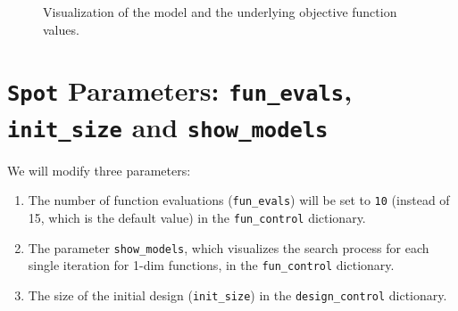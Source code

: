 \documentclass[
  letterpaper,
  DIV=11,
  numbers=noendperiod]{scrreprt}
\providecommand{\tightlist}{%
  \setlength{\itemsep}{0pt}\setlength{\parskip}{0pt}}\usepackage{longtable,booktabs,array}
\begin{document}
\begin{figure}[H]


\caption{\label{fig-spot-model-1d}Visualization of the model and the
underlying objective function values.}

\end{figure}%

\section{\texorpdfstring{\texttt{Spot} Parameters: \texttt{fun\_evals},
\texttt{init\_size} and
\texttt{show\_models}}{Spot Parameters: fun\_evals, init\_size and show\_models}}\label{spot-parameters-fun_evals-init_size-and-show_models}

We will modify three parameters:

\begin{enumerate}
\def\labelenumi{\arabic{enumi}.}
\tightlist
\item
  The number of function evaluations (\texttt{fun\_evals}) will be set
  to \texttt{10} (instead of 15, which is the default value) in the
  \texttt{fun\_control} dictionary.
\item
  The parameter \texttt{show\_models}, which visualizes the search
  process for each single iteration for 1-dim functions, in the
  \texttt{fun\_control} dictionary.
\item
  The size of the initial design (\texttt{init\_size}) in the
  \texttt{design\_control} dictionary.
\end{enumerate}
\end{document}
